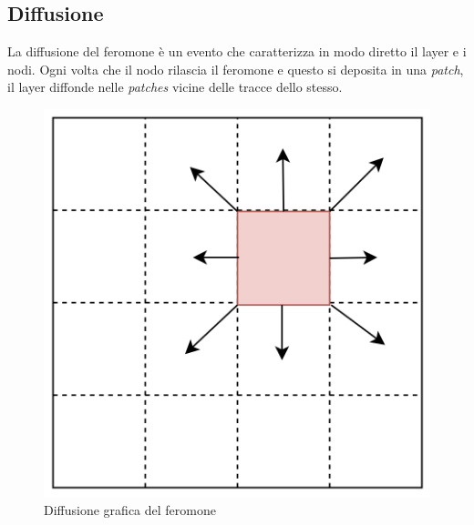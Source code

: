 \subsection{Diffusione}
La diffusione del feromone è un evento che caratterizza in modo diretto il layer e i nodi. Ogni volta che il nodo rilascia il feromone e
questo si deposita in una \textit{patch}, il layer diffonde nelle \textit{patches} vicine delle tracce dello stesso.
\begin{figure}[h!]
    \centering
    \includegraphics[width=.7\linewidth]{figures/diffusione.png}
    \caption{Diffusione grafica del feromone}\label{fig:diffusion}
\end{figure}
